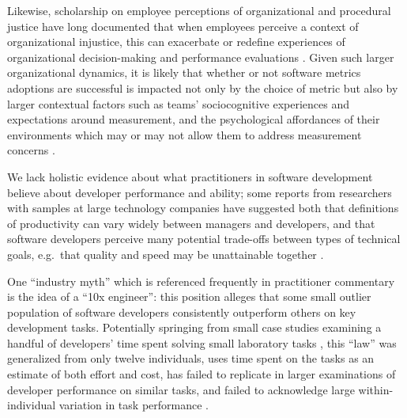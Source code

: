 \documentclass[
  sn-mathphys-ay,
]{sn-jnl}
\begin{document}
Likewise, scholarship on employee perceptions of organizational and
procedural justice have long documented that when employees perceive a
context of organizational injustice, this can exacerbate or redefine
experiences of organizational decision-making and performance
evaluations
\citep{brocknerInteractiveEffectsProcedural1994, brocknerProceduralFairnessOutcome2007}.
Given such larger organizational dynamics, it is likely that whether or
not software metrics adoptions are successful is impacted not only by
the choice of metric but also by larger contextual factors such as
teams' sociocognitive experiences and expectations around measurement,
and the psychological affordances of their environments which may or may
not allow them to address measurement concerns
\citep{hicksPsychologicalAffordancesCan2024}.

We lack holistic evidence about what practitioners in software
development believe about developer performance and ability; some
reports from researchers with samples at large technology companies have
suggested both that definitions of productivity can vary widely between
managers and developers, and that software developers perceive many
potential trade-offs between types of technical goals, e.g.~that quality
and speed may be unattainable together
\citep{storeyHowDevelopersManagers2022}.

One ``industry myth'' which is referenced frequently in practitioner
commentary is the idea of a ``10x engineer'': this position alleges that
some small outlier population of software developers consistently
outperform others on key development tasks. Potentially springing from
small case studies examining a handful of developers' time spent solving
small laboratory tasks
\citetext{\citealp{sackmanExploratoryExperimentalStudies1968}; \citealp[discussed
in][]{nicholsEndMythIndividual2019}}, this ``law'' was generalized from
only twelve individuals, uses time spent on the tasks as an estimate of
both effort and cost, has failed to replicate in larger examinations of
developer performance on similar tasks, and failed to acknowledge large
within-individual variation in task performance
\citep{nicholsEndMythIndividual2019, shrikanthAssessingPractitionerBeliefs2021}.
\end{document}

